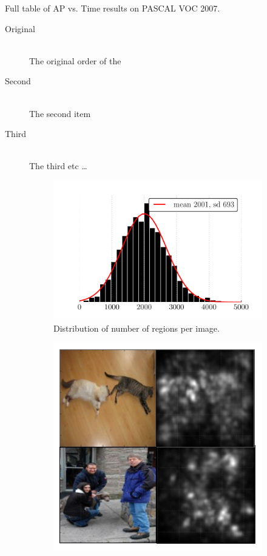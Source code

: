 \begin{table}[ht]
\centering
\caption{
Full table of AP vs. Time results on PASCAL VOC 2007.
}\label{tab:results}
\small{

}
\end{table}

\begin{description}
  \item[Original] \hfill \\
  The original order of the
  \item[Second] \hfill \\
  The second item
  \item[Third] \hfill \\
  The third etc \ldots
\end{description}

\begin{figure}
\centering
\begin{subfigure}[b]{0.52\linewidth}
    \includegraphics[width=\linewidth]{figures/roi_hist.pdf}
    \caption{Distribution of number of regions per image.}\label{fig:roi_hist}
\end{subfigure}\hfill
\begin{subfigure}[b]{0.46\linewidth}
    \includegraphics[width=\linewidth]{figures/gradient.pdf}

\end{subfigure}
\end{figure}
